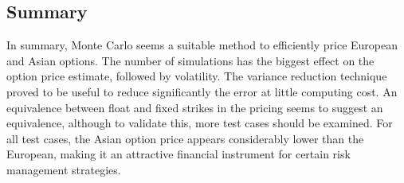 \documentclass{article}
\begin{document}
    \subsection{Summary}\label{summary}

In summary, Monte Carlo seems a suitable method to efficiently price European
and Asian options. The number of simulations has the biggest effect on
the option price estimate, followed by volatility. The variance
reduction technique proved to be useful to reduce significantly the
error at little computing cost. An equivalence between float and fixed
strikes in the pricing seems to suggest an equivalence, although to
validate this, more test cases should be examined. For all test cases,
the Asian option price appears considerably lower than the European,
making it an attractive financial instrument for certain risk management
strategies.


    
    
    
    
\end{document}
